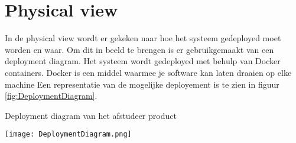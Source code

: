 \section{Physical view}
In de physical view wordt er gekeken naar hoe het systeem gedeployed moet worden en waar.
Om dit in beeld te brengen is er gebruikgemaakt van een deployment diagram.
Het systeem wordt gedeployed met behulp van Docker containers.
Docker is een middel waarmee je software kan laten draaien op elke machine \Parencite{Docker}
Een representatie van de mogelijke deployement is te zien in figuur \ref{fig:DeploymentDiagram}.

\whitespace
\begin{graphic}
    \captionsetup{type=figure}
    \caption{Deployment diagram van het afstudeer product}
    \texttt{[image: DeploymentDiagram.png]}
    \label{fig:DeploymentDiagram}
\end{graphic}
